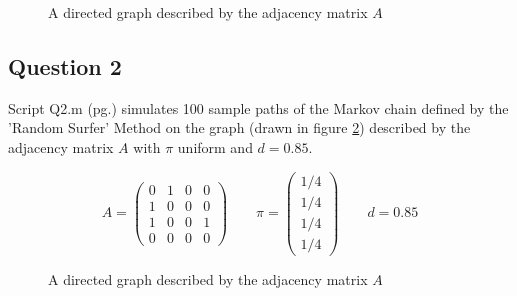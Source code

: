 \documentclass[a4paper]{article}
\begin{document}
\begin{figure}[H]
    \centering
    \caption{A directed graph described by the adjacency matrix $A$}
    \label{fig:q1}
\end{figure}

\subsection*{Question 2}
Script Q2.m (pg.\pageref{PQ2}) simulates 100 sample paths of the Markov chain defined by the 'Random Surfer' Method on the graph (drawn in figure \ref{fig:q2}) described by the adjacency matrix $A$ with $\pi$ uniform and $d=0.85$.

\begin{equation*}
    A = \begin{pmatrix}
        0 & 1 & 0 & 0 \\
        1 & 0 & 0 & 0 \\
        1 & 0 & 0 & 1 \\
        0 & 0 & 0 & 0
    \end{pmatrix}
    \qquad
    \pi = \begin{pmatrix} 1/4 \\ 1/4 \\ 1/4 \\ 1/4 \end{pmatrix}
    \qquad
    d = 0.85
\end{equation*}

\begin{figure}[H]
    \centering
    \caption{A directed graph described by the adjacency matrix $A$}
    \label{fig:q2}
\end{figure}
\end{document}
